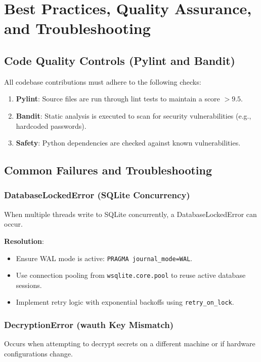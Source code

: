 \documentclass[12pt,a4paper]{report}
\begin{document}
\cleardoublepage
\chapter{Best Practices, Quality Assurance, and Troubleshooting}

\section{\sffamily Code Quality Controls (Pylint and Bandit)}
All codebase contributions must adhere to the following checks:
\begin{enumerate}
    \item \textbf{Pylint}: Source files are run through lint tests to maintain a score $>9.5$.
    \item \textbf{Bandit}: Static analysis is executed to scan for security vulnerabilities (e.g., hardcoded passwords).
    \item \textbf{Safety}: Python dependencies are checked against known vulnerabilities.
\end{enumerate}

\section{\sffamily Common Failures and Troubleshooting}
\subsection{\sffamily DatabaseLockedError (SQLite Concurrency)}
When multiple threads write to SQLite concurrently, a DatabaseLockedError can occur. 

\textbf{Resolution}:
\begin{itemize}
    \item Ensure WAL mode is active: \texttt{PRAGMA journal\_mode=WAL}.
    \item Use connection pooling from \texttt{wsqlite.core.pool} to reuse active database sessions.
    \item Implement retry logic with exponential backoffs using \texttt{retry\_on\_lock}.
\end{itemize}

\subsection{\sffamily DecryptionError (wauth Key Mismatch)}
Occurs when attempting to decrypt secrets on a different machine or if hardware configurations change.
\end{document}
